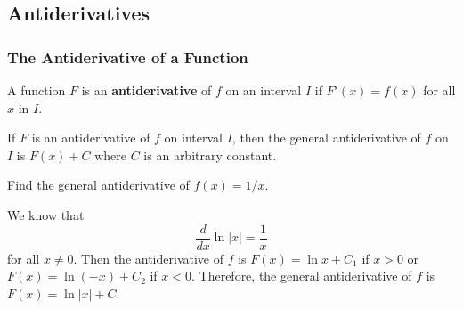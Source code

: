 \subsection{Antiderivatives}

\subsubsection*{The Antiderivative of a Function}
\begin{definition}
    A function \(F\) is an \textbf{antiderivative} of \(f\) on an interval
    \(I\) if \(F'(x)=f(x)\) for all \(x\) in \(I\).
\end{definition}
\begin{theorem}
    If \(F\) is an antiderivative of \(f\) on interval \(I\), then the general
    antiderivative of \(f\) on \(I\) is \(F(x)+C\) where \(C\) is an arbitrary
    constant.
\end{theorem}
\begin{problem}
    Find the general antiderivative of \(f(x)=1/x\).
\end{problem}
\begin{solution}
    We know that \[\frac{d}{dx}\ln |x|=\frac{1}{x}\] for all \(x\neq 0\).
    Then the antiderivative of \(f\) is \(F(x)=\ln x+C_1\) if \(x>0\)
    or \(F(x)=\ln(-x)+C_2\) if \(x<0\).
    Therefore, the general antiderivative of \(f\) is \(F(x)=\ln |x|+C\).
\end{solution}